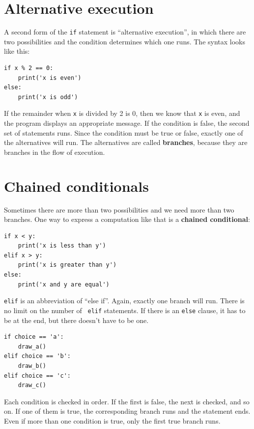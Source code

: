 \documentclass[10pt]{book}
\begin{document}
\section{Alternative execution}
\label{alternative.execution}

A second form of the {\tt if} statement is ``alternative execution'',
in which there are two possibilities and the condition determines
which one runs.  The syntax looks like this:

\begin{verbatim}
if x % 2 == 0:
    print('x is even')
else:
    print('x is odd')
\end{verbatim}
%
If the remainder when {\tt x} is divided by 2 is 0, then we know that
{\tt x} is even, and the program displays an appropriate message.  If
the condition is false, the second set of statements runs.
Since the condition must be true or false, exactly one of the
alternatives will run.  The alternatives are called {\bf
  branches}, because they are branches in the flow of execution.



\section{Chained conditionals}

Sometimes there are more than two possibilities and we need more than
two branches.  One way to express a computation like that is a {\bf
chained conditional}:

\begin{verbatim}
if x < y:
    print('x is less than y')
elif x > y:
    print('x is greater than y')
else:
    print('x and y are equal')
\end{verbatim}
%
{\tt elif} is an abbreviation of ``else if''.  Again, exactly one
branch will run.  There is no limit on the number of {\tt
elif} statements.  If there is an {\tt else} clause, it has to be
at the end, but there doesn't have to be one.

\begin{verbatim}
if choice == 'a':
    draw_a()
elif choice == 'b':
    draw_b()
elif choice == 'c':
    draw_c()
\end{verbatim}
%
Each condition is checked in order.  If the first is false,
the next is checked, and so on.  If one of them is
true, the corresponding branch runs and the statement
ends.  Even if more than one condition is true, only the
first true branch runs.  
\end{document}
